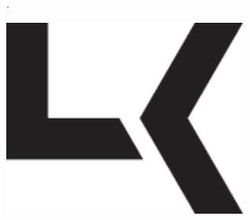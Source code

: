 
.
\vspace{4cm}
\begin{center}
  \includegraphics[width=0.6\textwidth]{../general/logo_black.pdf}
\end{center}

\vspace*{2cm}
\begin{center}
  {\Huge\textbf{\textsf{\docTitle}}}
\end{center}

\vspace*{1cm}
\begin{center}
  {\Huge\textbf{\textsf{\productName}}}
\end{center}

\begin{center}
  {\Huge\textbf{\textsf{\docSubTitle}}}
\end{center}

\afterpage{\nopagecolor}
\newpage
